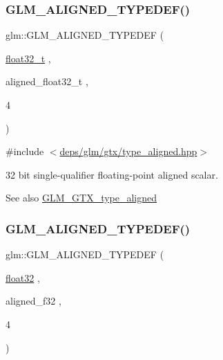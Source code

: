 \subsubsection{\texorpdfstring{G\+L\+M\+\_\+\+A\+L\+I\+G\+N\+E\+D\+\_\+\+T\+Y\+P\+E\+D\+E\+F()}{GLM\_ALIGNED\_TYPEDEF()}\hspace{0.1cm}{\footnotesize\ttfamily [138/209]}}
{\footnotesize\ttfamily glm\+::\+G\+L\+M\+\_\+\+A\+L\+I\+G\+N\+E\+D\+\_\+\+T\+Y\+P\+E\+D\+EF (\begin{DoxyParamCaption}\item[{\hyperlink{group__gtc__type__precision_ga642737ae3e7c434b366f2191e6944bf2}{float32\+\_\+t}}]{,  }\item[{aligned\+\_\+float32\+\_\+t}]{,  }\item[{4}]{ }\end{DoxyParamCaption})}



{\ttfamily \#include $<$\hyperlink{gtx_2type__aligned_8hpp}{deps/glm/gtx/type\+\_\+aligned.\+hpp}$>$}

32 bit single-\/qualifier floating-\/point aligned scalar. \begin{DoxySeeAlso}{See also}
\hyperlink{group__gtx__type__aligned}{G\+L\+M\+\_\+\+G\+T\+X\+\_\+type\+\_\+aligned} 
\end{DoxySeeAlso}
\mbox{\label{group__gtx__type__aligned_gadbce23b9f23d77bb3884e289a574ebd5}} 
\subsubsection{\texorpdfstring{G\+L\+M\+\_\+\+A\+L\+I\+G\+N\+E\+D\+\_\+\+T\+Y\+P\+E\+D\+E\+F()}{GLM\_ALIGNED\_TYPEDEF()}\hspace{0.1cm}{\footnotesize\ttfamily [139/209]}}
{\footnotesize\ttfamily glm\+::\+G\+L\+M\+\_\+\+A\+L\+I\+G\+N\+E\+D\+\_\+\+T\+Y\+P\+E\+D\+EF (\begin{DoxyParamCaption}\item[{\hyperlink{group__gtc__type__precision_ga814f2f65354b6588b067cc5c67a6b340}{float32}}]{,  }\item[{aligned\+\_\+f32}]{,  }\item[{4}]{ }\end{DoxyParamCaption})}



